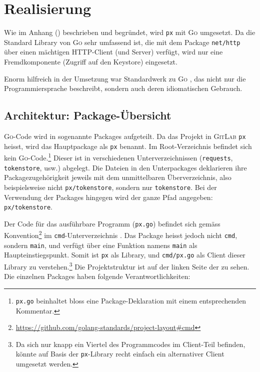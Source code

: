 \section{Realisierung}
\label{sec:Realisierung}

Wie im Anhang () beschrieben und begründet, wird \texttt{px} mit \textsc{Go} umgesetzt. Da die Standard Library von \textsc{Go} sehr umfassend ist, die mit dem Package \texttt{net/http} über einen mächtigen HTTP-Client (und Server) verfügt, wird nur eine Fremdkomponente (Zugriff auf den Keystore) eingesetzt.

Enorm hilfreich in der Umsetzung war Standardwerk zu \textsc{Go} \cite{gopl}, das nicht nur die Programmiersprache beschreibt, sondern auch deren idiomatischen Gebrauch.

\subsection{Architektur: Package-Übersicht}

\textsc{Go}-Code wird in sogenannte Packages aufgeteilt. Da das Projekt in \textsc{GitLab} \texttt{px} heisst, wird das Hauptpackage als \texttt{px} benannt. Im Root-Verzeichnis befindet sich kein \textsc{Go}-Code.\footnote{\texttt{px.go} beinhaltet bloss eine Package-Deklaration mit einem entsprechenden Kommentar.} Dieser ist in verschiedenen Unterverzeichnissen (\texttt{requests}, \texttt{tokenstore}, usw.) abgelegt. Die Dateien in den Unterpackages deklarieren ihre Packagezugehörigkeit jeweils mit dem unmittelbaren Überverzeichnis, also beispielsweise nicht \texttt{px/tokenstore}, sondern nur \texttt{tokenstore}. Bei der Verwendung der Packages hingegen wird der ganze Pfad angegeben: \texttt{px/tokenstore}.

Der Code für das ausführbare Programm (\texttt{px.go}) befindet sich gemäss Konvention\footnote{\url{https://github.com/golang-standards/project-layout\#cmd}} im \texttt{cmd}-Unterverzeichnis \cite[S. 12]{powerful-cli-apps-in-go}. Das Package heisst jedoch nicht \texttt{cmd}, sondern \texttt{main}, und verfügt über eine Funktion namens \texttt{main} als Haupteinstiegspunkt. Somit ist \texttt{px} als Library, und \texttt{cmd/px.go} als Client dieser Library zu verstehen.\footnote{Da sich nur knapp ein Viertel des Programmcodes im Client-Teil befinden, könnte auf Basis der \texttt{px}-Library recht einfach ein alternativer Client umgesetzt werden.} Die Projektstruktur ist auf der linken Seite der  zu sehen. Die einzelnen Packages haben folgende Verantwortlichkeiten:

